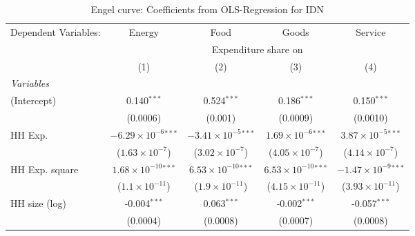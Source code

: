 
\begin{table}[htbp!]
   \centering
   \small
   \begin{adjustbox}{width = 1\textwidth, max height = 0.95\textheight, center}
      \begin{threeparttable}[b]
         \caption{\label{tab:Engel_parametric_IDN} Engel curve: Coefficients from OLS-Regression for IDN}
         \begin{tabular}{lcccc}
            \tabularnewline \midrule \midrule
            Dependent Variables: & Energy                         & Food                           & Goods                          & Service\\  
             & \multicolumn{4}{c}{Expenditure share on} \\ 
                                 & (1)                            & (2)                            & (3)                            & (4)\\  
            \midrule
            \emph{Variables}\\
            (Intercept)          & 0.140$^{***}$                  & 0.524$^{***}$                  & 0.186$^{***}$                  & 0.150$^{***}$\\   
                                 & (0.0006)                       & (0.001)                        & (0.0009)                       & (0.0010)\\   
            HH Exp.              & $-6.29\times 10^{-6}$$^{***}$  & $-3.41\times 10^{-5}$$^{***}$  & $1.69\times 10^{-6}$$^{***}$   & $3.87\times 10^{-5}$$^{***}$\\    
                                 & ($1.63\times 10^{-7}$)         & ($3.02\times 10^{-7}$)         & ($4.05\times 10^{-7}$)         & ($4.14\times 10^{-7}$)\\    
            HH Exp. square       & $1.68\times 10^{-10}$$^{***}$  & $6.53\times 10^{-10}$$^{***}$  & $6.53\times 10^{-10}$$^{***}$  & $-1.47\times 10^{-9}$$^{***}$\\    
                                 & ($1.1\times 10^{-11}$)         & ($1.9\times 10^{-11}$)         & ($4.15\times 10^{-11}$)        & ($3.93\times 10^{-11}$)\\    
            HH size (log)        & -0.004$^{***}$                 & 0.063$^{***}$                  & -0.002$^{***}$                 & -0.057$^{***}$\\   
                                 & (0.0004)                       & (0.0008)                       & (0.0007)                       & (0.0008)\\   

\end{tabular}
\end{threeparttable}
\end{adjustbox}
\end{table}
